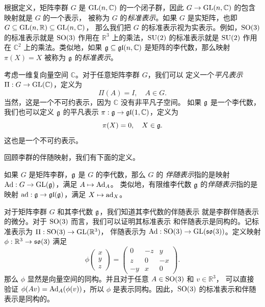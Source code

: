 根据定义，矩阵李群 $G$ 是 $\operatorname{GL}(n,\mathbb{C})$ 的一个闭子群，因此
$G\to \operatorname{GL}(n,\mathbb{C})$ 的包含映射就是 $G$ 的一个表示，
被称为 $G$ 的\emph{标准表示}。如果 $G$ 是实矩阵，也即 $G\subseteq \operatorname{GL}(n,\mathbb{R})\subseteq \operatorname{GL}(n,\mathbb{C})$，
那么我们把 $G$ 的标准表示视为实表示。例如，$\operatorname{SO}(3)$ 的标准表示就是 
$\operatorname{SO}(3)$ 作用在 $\mathbb{R}^3$ 上的乘法，$\operatorname{SU}(2)$ 的标准表示就是
$\operatorname{SU}(2)$ 作用在 $\mathbb{C}^2$ 上的乘法。类似地，如果 $\mathfrak{g}\subseteq \mathfrak{gl}(n,\mathbb{C})$
是矩阵的李代数，那么映射 $\pi(X)=X$ 被称为 $\mathfrak{g}$ 的\emph{标准表示}。

考虑一维复向量空间 $\mathbb{C}$。对于任意矩阵李群 $G$，我们可以
定义一个\emph{平凡表示} $\Pi:G\to \operatorname{GL}(\mathbb{C})$，定义为
\[
  \Pi(A) =I,\quad A\in G.
\]
当然，这是一个不可约表示，因为 $\mathbb{C}$ 没有非平凡子空间。
如果 $\mathfrak{g}$ 是一个李代数，我们也可以定义 $\mathfrak{g}$ 的平凡表示
$\pi:\mathfrak{g}\to \mathfrak{gl}(1,\mathbb{C})$，定义为
\[
  \pi(X)=0,\quad X\in\mathfrak{g}.
\]
这也是一个不可约表示。

回顾李群的伴随映射，我们有下面的定义。

\begin{definition}
  如果 $G$ 是矩阵李群，$\mathfrak{g}$ 是 $G$ 的李代数，那么 $G$ 的
  \emph{伴随表示}指的是映射 $\operatorname{Ad}:G\to\operatorname{GL}(\mathfrak{g})$，满足 $A\mapsto \operatorname{Ad}_A$。
  类似地，有限维李代数 $\mathfrak{g}$ 的\emph{伴随表示}指的是映射
  $\operatorname{ad}:\mathfrak{g}\to\mathfrak{gl}(\mathfrak{g})$，满足 $X\mapsto \operatorname{ad}_X$。
\end{definition}

对于矩阵李群 $G$ 和其李代数 $\mathfrak{g}$，我们知道其李代数的伴随表示
就是李群伴随表示的微分。对于 $\operatorname{SO}(3)$ 而言，我们可以证明其标准表示
和伴随表示是同构的。记标准表示为 $\Pi:\operatorname{SO}(3)\to\operatorname{GL}(\mathbb{R}^3)$，
伴随表示为 $\operatorname{Ad}:\operatorname{SO}(3)\to\operatorname{GL}(\mathfrak{so}(3))$。定义映射 $\phi:\mathbb{R}^3\to\mathfrak{so}(3)$
满足
\begin{equation*}
  \phi\begin{pmatrix}
    x\\y\\z
  \end{pmatrix}
  =\begin{pmatrix}
    0 & -z & y \\
    z & 0 & -x \\
    -y & x & 0
  \end{pmatrix}.
\end{equation*}
那么 $\phi$ 显然是向量空间的同构。并且对于任意 $A\in \operatorname{SO}(3)$ 和 $v\in \mathbb{R}^3$，
可以直接验证 $\phi(Av)=\operatorname{Ad}_A(\phi(v))$，所以 $\phi$ 是表示同构。因此，$\operatorname{SO}(3)$ 的标准表示和伴随表示是同构的。

